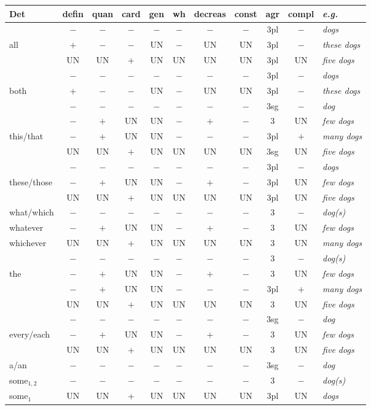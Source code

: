 \begin{table}
\centering
\begin{tabular}{|l||c|c|c|c|c|c|c|c|c||l|}
\hline
Det&defin&quan&card&gen&wh&decreas&const&agr&compl&{\it e.g.}\\
\hline
\hline
&$-$&$-$&$-$&$-$&$-$&$-$&$-$&3pl&$-$&{\it dogs}\\
all&$+$&$-$&$-$&UN&$-$&UN&UN&3pl&$-$&{\it these dogs}\\
&UN&UN&$+$&UN&UN&UN&UN&3pl&UN&{\it five dogs}\\
\hline
&$-$&$-$&$-$&$-$&$-$&$-$&$-$&3pl&$-$&{\it dogs}\\
{both}&$+$&$-$&$-$&UN&$-$&UN&UN&3pl&$-$&{\it these dogs}\\
\hline
&$-$&$-$&$-$&$-$&$-$&$-$&$-$&3sg&$-$&{\it dog}\\
&$-$&$+$&UN&UN&$-$&$+$&$-$&3&UN&{\it few dogs}\\
{this/that}&$-$&$+$&UN&UN&$-$&$-$&$-$&3pl&$+$&{\it many dogs}\\
&UN&UN&$+$&UN&UN&UN&UN&3sg&UN&{\it five dogs}\\
\hline
&$-$&$-$&$-$&$-$&$-$&$-$&$-$&3pl&$-$&{\it dogs}\\
these/those&$-$&$+$&UN&UN&$-$&$+$&$-$&3pl&UN&{\it few dogs}\\
&UN&UN&$+$&UN&UN&UN&UN&3pl&UN&{\it five dogs}\\
\hline
what/which&$-$&$-$&$-$&$-$&$-$&$-$&$-$&3&$-$&{\it dog(s)}\\
whatever&$-$&$+$&UN&UN&$-$&$+$&$-$&3&UN&{\it few dogs}\\
whichever&UN&UN&$+$&UN&UN&UN&UN&3&UN&{\it many dogs}\\
\hline
&$-$&$-$&$-$&$-$&$-$&$-$&$-$&3&$-$&{\it dog(s)}\\
the&$-$&$+$&UN&UN&$-$&$+$&$-$&3&UN&{\it few dogs}\\
&$-$&$+$&UN&UN&$-$&$-$&$-$&3pl&$+$&{\it many dogs}\\
&UN&UN&$+$&UN&UN&UN&UN&3&UN&{\it five dogs}\\
\hline
&$-$&$-$&$-$&$-$&$-$&$-$&$-$&3sg&$-$&{\it dog}\\
every/each&$-$&$+$&UN&UN&$-$&$+$&$-$&3&UN&{\it few dogs}\\
&UN&UN&$+$&UN&UN&UN&UN&3&UN&{\it five dogs}\\
\hline
a/an&$-$&$-$&$-$&$-$&$-$&$-$&$-$&3sg&$-$&{\it dog}\\
\hline
some$_{1,2}$&$-$&$-$&$-$&$-$&$-$&$-$&$-$&3&$-$&{\it dog(s)}\\
some$_{1}$&UN&UN&$+$&UN&UN&UN&UN&3pl&UN&{\it dogs}\\

\end{tabular}
\end{table}

